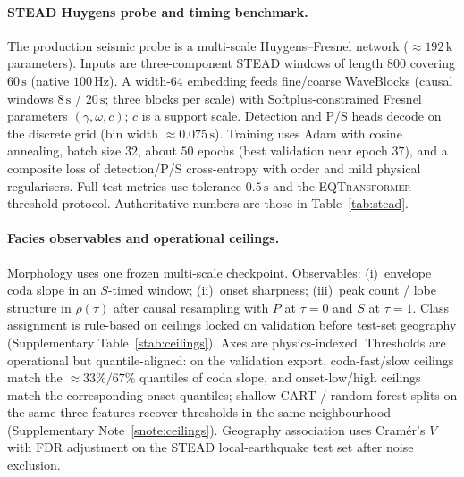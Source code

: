 \documentclass[twocolumn,10pt]{article}
\newcommand{\stead}{\textsc{STEAD}}
\newcommand{\eqt}{\textsc{EQTransformer}}
\begin{document}
\paragraph{\stead{} Huygens probe and timing benchmark.}
The production seismic probe is a multi-scale Huygens--Fresnel network
(\(\approx192\,\mathrm{k}\) parameters). Inputs are three-component \stead{}
windows of length \(800\) covering \(60\,\mathrm{s}\) (native \(100\,\mathrm{Hz}\)).
A width-\(64\) embedding feeds fine/coarse WaveBlocks (causal windows
\(8\,\mathrm{s}\) / \(20\,\mathrm{s}\); three blocks per scale) with
Softplus-constrained Fresnel parameters \((\gamma,\omega,c)\); \(c\) is a
support scale. Detection and P/S heads decode on the discrete grid (bin width
\(\approx0.075\,\mathrm{s}\)). Training uses Adam with cosine annealing, batch
size \(32\), about \(50\) epochs (best validation near epoch \(37\)), and a
composite loss of detection/P/S cross-entropy with order and mild physical
regularisers. Full-test metrics use tolerance \(0.5\,\mathrm{s}\) and the
\eqt{} threshold protocol. Authoritative numbers are those in
Table~\ref{tab:stead}.

\paragraph{Facies observables and operational ceilings.}
Morphology uses one frozen multi-scale checkpoint. Observables:
(i)~envelope coda slope in an \(S\)-timed window;
(ii)~onset sharpness;
(iii)~peak count / lobe structure in \(\rho(\tau)\) after causal resampling with
\(P\) at \(\tau=0\) and \(S\) at \(\tau=1\). Class assignment is rule-based on
ceilings locked on validation before test-set geography
(Supplementary Table~\ref{stab:ceilings}). Axes are physics-indexed. Thresholds
are operational but quantile-aligned: on the validation export, coda-fast/slow
ceilings match the \(\approx33\%/67\%\) quantiles of coda slope, and
onset-low/high ceilings match the corresponding onset quantiles; shallow CART /
random-forest splits on the same three features recover thresholds in the same
neighbourhood (Supplementary Note~\ref{snote:ceilings}). Geography association
uses Cram\'er's \(V\) with FDR adjustment on the \stead{} local-earthquake test
set after noise exclusion.
\end{document}
